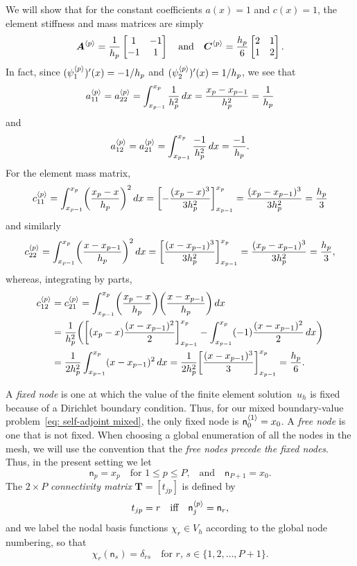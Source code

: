 \begin{example}\label{example: linear elt matrix 1d}
We will show that for the constant coefficients $a(x)=1$ and $c(x)=1$, the
element stiffness and mass matrices are simply
\[
\boldsymbol{A}^{\langle p\rangle}=\frac{1}{h_p}\begin{bmatrix}1&-1\\ -1&1\end{bmatrix}
\quad\text{and}\quad
\boldsymbol{C}^{\langle p\rangle}=\frac{h_p}{6}\begin{bmatrix}2&1\\ 1&2\end{bmatrix}.
\]
In fact, since $(\psi^{\langle p\rangle}_1)'(x)=-1/h_p$ and 
$(\psi^{\langle p\rangle}_2)'(x)=1/h_p$, we see that
\[
a^{\langle p\rangle}_{11}=a^{\langle p\rangle}_{22}
    =\int_{x_{p-1}}^{x_p}\frac{1}{h_p^2}\,dx
    =\frac{x_p-x_{p-1}}{h_p^2}=\frac{1}{h_p}
\]
and
\[
a^{\langle p\rangle}_{12}=a^{\langle p\rangle}_{21}
    =\int_{x_{p-1}}^{x_p}\frac{-1}{h_p^2}\,dx=\frac{-1}{h_p}.
\]
For the element mass matrix,
\[
c^{\langle p\rangle}_{11}=\int_{x_{p-1}}^{x_p}\biggl(\frac{x_p-x}{h_p}\biggr)^2\,dx
    =\biggl[-\frac{(x_p-x)^3}{3h_p^2}\biggr]_{x_{p-1}}^{x_p}
    =\frac{(x_p-x_{p-1})^3}{3h_p^2}=\frac{h_p}{3}
\]
and similarly
\[
c^{\langle p\rangle}_{22}=\int_{x_{p-1}}^{x_p}\biggl(\frac{x-x_{p-1}}{h_p}\biggr)^2\,dx
    =\biggl[\frac{(x-x_{p-1})^3}{3h_p^2}\biggr]_{x_{p-1}}^{x_p}
    =\frac{(x_p-x_{p-1})^3}{3h_p^2}=\frac{h_p}{3},
\]
whereas, integrating by parts,
\begin{align*}
c^{\langle p\rangle}_{12}&=c^{\langle p\rangle}_{21}=\int_{x_{p-1}}^{x_p}
    \biggl(\frac{x_p-x}{h_p}\biggr)\biggl(\frac{x-x_{p-1}}{h_p}\biggr)\,dx\\
    &=\frac{1}{h_p^2}\biggl(
    \biggl[(x_p-x)\frac{(x-x_{p-1})^2}{2}\biggr]_{x_{p-1}}^{x_p}
    -\int_{x_{p-1}}^{x_p}(-1)\frac{(x-x_{p-1})^2}{2}\,dx\biggr)\\
    &=\frac{1}{2h_p^2}\int_{x_{p-1}}^{x_p}(x-x_{p-1})^2\,dx
    =\frac{1}{2h_p^2}\biggl[\frac{(x-x_{p-1})^3}{3}\biggr]_{x_{p-1}}^{x_p}
    =\frac{h_p}{6}.
\end{align*}
\end{example}

A \emph{fixed node} is one at which the value of the finite element 
solution~$u_h$ is fixed because of a Dirichlet boundary condition.  Thus, for 
our mixed boundary-value problem~\eqref{eq: self-adjoint mixed}, the only 
fixed node is $\mathsf{n}_0^{\langle1\rangle}=x_0$.  A \emph{free node} is one that is
not fixed.  When choosing a global enumeration of all the nodes in the mesh, we
will use the convention that the \emph{free nodes precede the fixed nodes}.
Thus, in the present setting we let
\[
\mathsf{n}_p=x_p\quad\text{for $1\le p\le P$,}
\quad\text{and}\quad\mathsf{n}_{P+1}=x_0.
\]
The $2\times P$ \emph{connectivity matrix} $\boldsymbol{T}=[t_{jp}]$ is defined
by
\begin{equation}\label{eq: e pm def}
t_{jp}=r\quad\text{iff}\quad\mathsf{n}^{\langle p\rangle}_j=\mathsf{n}_r,
\end{equation}
and we label the nodal basis functions $\chi_r\in V_h$ according to the global 
node numbering, so that
\[
\chi_r(\mathsf{n}_s)=\delta_{rs}\quad\text{for $r$, $s\in\{1,2,\ldots,P+1\}$.}
\]

